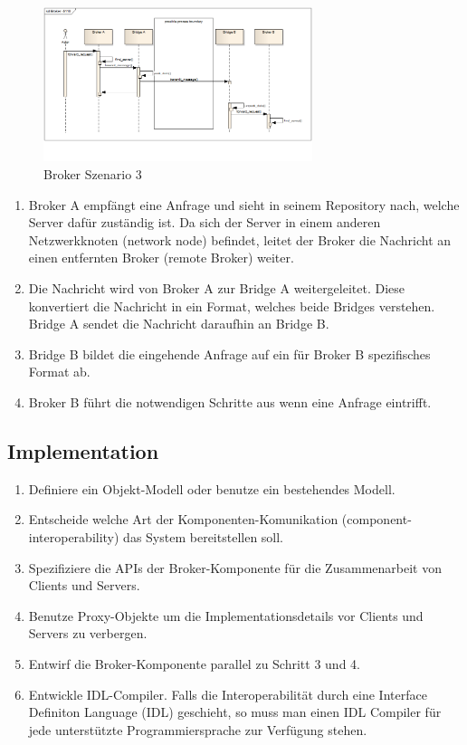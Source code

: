 \begin{figure}[H]
	\centering
	\includegraphics[width=0.7\textwidth]{content/posa1/images/broker-scen3.png}
	\caption{Broker Szenario 3}
\end{figure}

\begin{enumerate}
	\item Broker A empfängt eine Anfrage und sieht in seinem Repository nach, welche Server dafür zuständig ist. Da sich der Server in einem anderen Netzwerkknoten (network node) befindet, leitet der Broker die Nachricht an einen entfernten Broker (remote Broker) weiter.
	\item Die Nachricht wird von Broker A zur Bridge A weitergeleitet. Diese konvertiert die Nachricht in ein Format, welches beide Bridges verstehen. Bridge A sendet die Nachricht daraufhin an Bridge B.
	\item Bridge B bildet die eingehende Anfrage auf ein für Broker B spezifisches Format ab.
	\item Broker B führt die notwendigen Schritte aus wenn eine Anfrage eintrifft.
\end{enumerate}

\subsection*{Implementation}

\begin{enumerate}
	\item Definiere ein Objekt-Modell oder benutze ein bestehendes Modell.
	\item Entscheide welche Art der Komponenten-Komunikation (component-interoperability) das System bereitstellen soll.
	\item Spezifiziere die APIs der Broker-Komponente für die Zusammenarbeit von Clients und Servers.
	\item Benutze Proxy-Objekte um die Implementationsdetails vor Clients und Servers zu verbergen.
	\item Entwirf die Broker-Komponente parallel zu Schritt 3 und 4.
	\item Entwickle IDL-Compiler. Falls die Interoperabilität durch eine Interface Definiton Language (IDL) geschieht, so muss man einen IDL Compiler für jede unterstützte Programmiersprache zur Verfügung stehen.
\end{enumerate}


